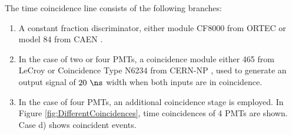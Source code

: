 The time coincidence line consists of the following branches:

\begin{enumerate}

\item{}  A constant fraction discriminator, either module CF8000 from ORTEC \cite{DataSheetDiscriminator} or model 84 from CAEN \cite{DataSheetDiscriminatorCAEN}.

\item{} In the case of two or four PMTs, a coincidence module either 465 from LeCroy \cite{DataSheetCoincidenceLeCroy} or Coincidence Type N6234 from CERN-NP \cite{DataSheetCoincidenceCERN}, used to generate an output signal of $20~\ns$ width when both inputs are in coincidence. 

\item{} In the case of four PMTs, an additional coincidence stage is employed. In Figure \ref{fig:DifferentCoincidences}, time coincidences of 4 PMTs are shown. Case d) shows coincident events.






\end{enumerate}
